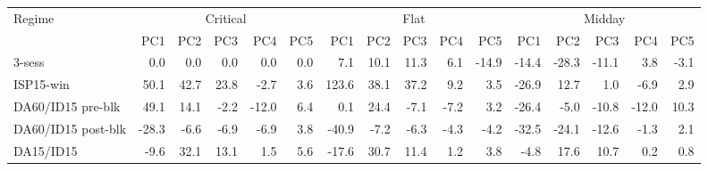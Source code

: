 \begin{tabular}{l r r r r r r r r r r r r r r r}
\toprule
Regime & \multicolumn{5}{c}{Critical} & \multicolumn{5}{c}{Flat} & \multicolumn{5}{c}{Midday} \\
\cmidrule(lr){2-6}\cmidrule(lr){7-11}\cmidrule(lr){12-16}
 & PC1 & PC2 & PC3 & PC4 & PC5 & PC1 & PC2 & PC3 & PC4 & PC5 & PC1 & PC2 & PC3 & PC4 & PC5 \\
\midrule
3-sess & 0.0 & 0.0 & 0.0 & 0.0 & 0.0 & 7.1 & 10.1 & 11.3 & 6.1 & -14.9 & -14.4 & -28.3 & -11.1 & 3.8 & -3.1 \\
ISP15-win & 50.1 & 42.7 & 23.8 & -2.7 & 3.6 & 123.6 & 38.1 & 37.2 & 9.2 & 3.5 & -26.9 & 12.7 & 1.0 & -6.9 & 2.9 \\
DA60/ID15 pre-blk & 49.1 & 14.1 & -2.2 & -12.0 & 6.4 & 0.1 & 24.4 & -7.1 & -7.2 & 3.2 & -26.4 & -5.0 & -10.8 & -12.0 & 10.3 \\
DA60/ID15 post-blk & -28.3 & -6.6 & -6.9 & -6.9 & 3.8 & -40.9 & -7.2 & -6.3 & -4.3 & -4.2 & -32.5 & -24.1 & -12.6 & -1.3 & 2.1 \\
DA15/ID15 & -9.6 & 32.1 & 13.1 & 1.5 & 5.6 & -17.6 & 30.7 & 11.4 & 1.2 & 3.8 & -4.8 & 17.6 & 10.7 & 0.2 & 0.8 \\
\bottomrule
\end{tabular}